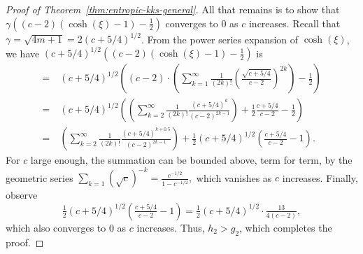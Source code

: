 \begin{proof}[Proof of Theorem~\ref{thm:entropic-kks-general}]
  All that remains is to show that
  $\gamma \left( (c-2)(\cosh(\xi)-1)  - \tfrac{1}{2} \right)$ converges to 0 as $c$ increases.
  Recall that $\gamma = \sqrt{4m+1} = 2(c+5/4)^{1/2}$.
  From the power series expansion of $\cosh(\xi)$, we have
 $(c+5/4)^{1/2} \left( (c-2)(\cosh(\xi) -1 ) - \tfrac{1}{2} \right)$ is
  \begin{align*}
      =~& (c+5/4)^{1/2} \left(  (c-2)\cdot\left( \sum_{k=1}^{\infty} \tfrac{1}{(2k)!} \left( \tfrac{\sqrt{c+5/4}}{c-2} \right)^{2k}  \right) - \tfrac{1}{2} \right) \\
     =~& (c+5/4)^{1/2} \left(  \left( \sum_{k=2}^{\infty} \tfrac{1}{(2k)!}
     \tfrac{(c+5/4)^{k} }{(c-2)^{2k-1}} \right) + \tfrac{1}{2}\tfrac{c+5/4}{c-2} - \tfrac{1}{2} \right) \\
     =~& \left( \sum_{k=2}^{\infty} \tfrac{1}{(2k)!}
     \tfrac{(c+5/4)^{k + 0.5} }{(c-2)^{2k-1}}\right) + \tfrac{1}{2} (c+5/4)^{1/2} \left( \tfrac{c+5/4}{c-2} - 1\right).
  \end{align*}
  For $c$ large enough, the summation can be bounded above, term for term, by the geometric series
  $\sum_{k=1} (\sqrt{c})^{-k} = \frac{c^{-1/2}}{1 - c^{-1/2}},$
  which vanishes as $c$ increases.
  Finally, observe
  \[
  \tfrac{1}{2}(c+5/4)^{1/2}\left(\tfrac{c+5/4}{c-2} - 1\right) = \tfrac{1}{2}(c+5/4)^{1/2}\cdot \tfrac{13}{4(c-2)},
  \]
  which also converges to 0 as $c$ increases.
  Thus, $h_2 > g_2$, which completes the proof.

\end{proof}
